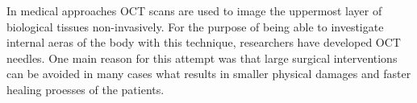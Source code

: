 

In medical approaches OCT scans are used to image the uppermost layer of biological tissues non-invasively.
For the purpose of being able to investigate internal aeras of the body with this technique, researchers have developed 
OCT needles. 
One main reason for this attempt was that large surgical interventions can be avoided in many cases what 
results in smaller physical damages and faster healing proesses of the patients.

